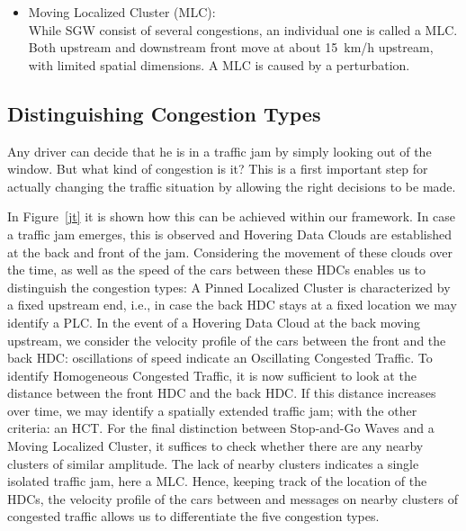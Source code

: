 \documentclass{acmrip}
\begin{document}
\begin{itemize}
    \item Moving Localized Cluster (MLC):\\
While SGW consist of several congestions, an individual one is
called a MLC. Both upstream and downstream front move at about
15~km/h upstream, with limited spatial dimensions. A MLC is caused
by a perturbation.
    \end{itemize}
    \fi

\subsection{Distinguishing Congestion Types}
Any driver can decide that he is in a traffic jam by simply looking
out of the window. But what kind of congestion is it? This is a first
important step for actually changing the traffic situation by
allowing the right decisions to be made.

In Figure~\ref{jt} it is shown how this can be achieved within our
framework. In case a traffic jam emerges, this is observed and
Hovering Data Clouds are established at the back and front of the
jam. Considering the movement of these clouds over the time, as well
as the speed of the cars between these HDCs enables us to
distinguish the congestion types: A Pinned Localized Cluster is
characterized by a fixed upstream end, i.e., in case the back HDC
stays at a fixed location we may identify a PLC. In the event of a
Hovering Data Cloud at the back moving upstream, we consider the
velocity profile of the cars between the front and the back HDC:
oscillations of speed indicate an Oscillating Congested Traffic. To
identify Homogeneous Congested Traffic, it is now sufficient to look
at the distance between the front HDC and the back HDC. If this
distance increases over time, we may identify a spatially extended
traffic jam; with the other criteria: an HCT. For the final
distinction between Stop-and-Go Waves and a Moving Localized
Cluster, it suffices to check whether there are any nearby clusters
of similar amplitude. The lack of nearby clusters indicates a single
isolated traffic jam, here a MLC. Hence, keeping track of the
location of the HDCs, the velocity profile of the cars between and
messages on nearby clusters of congested traffic allows us to
differentiate the five congestion types.


\iffalse
\begin{figure}[tp]
\centering \epsfig{file=jamtypes_diff_2.eps, width=.6\textwidth}
\caption{\label{jt}\small Schematic distinction of traffic jam
types. These considerations are carried out on the HDC level for
each cluster. }
\end{figure}
\fi
\end{document}
